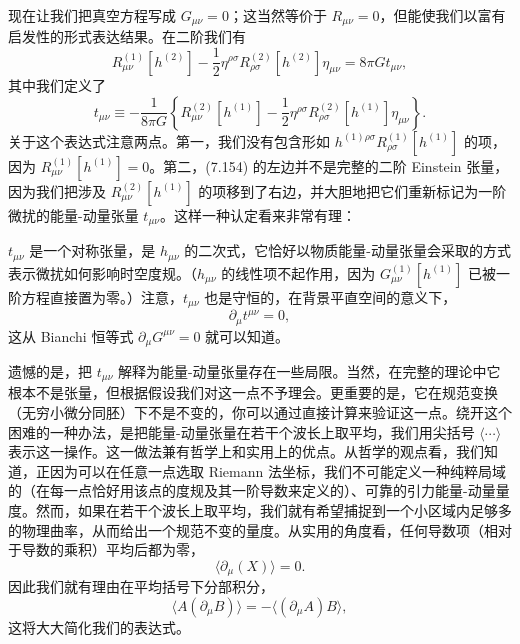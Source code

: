 现在让我们把真空方程写成 $G_{\mu\nu} = 0$；这当然等价于 $R_{\mu\nu} = 0$，但能使我们以富有启发性的形式表达结果。在二阶我们有
\begin{equation*}
R^{(1)}_{\mu\nu}[h^{(2)}] - \frac{1}{2}\eta^{\rho\sigma}R^{(2)}_{\rho\sigma}[h^{(2)}]\eta_{\mu\nu} = 8\pi G t_{\mu\nu},
\tag{7.154}
\end{equation*}
其中我们定义了
\begin{equation*}
t_{\mu\nu} \equiv -\frac{1}{8\pi G}\left\{R^{(2)}_{\mu\nu}[h^{(1)}] - \frac{1}{2}\eta^{\rho\sigma}R^{(2)}_{\rho\sigma}[h^{(1)}]\eta_{\mu\nu}\right\}.
\tag{7.155}
\end{equation*}
关于这个表达式注意两点。第一，我们没有包含形如 $h^{(1)\rho\sigma}R^{(1)}_{\rho\sigma}[h^{(1)}]$ 的项，因为 $R^{(1)}_{\mu\nu}[h^{(1)}] = 0$。第二，(7.154) 的左边并不是完整的二阶 Einstein 张量，因为我们把涉及 $R^{(2)}_{\mu\nu}[h^{(1)}]$ 的项移到了右边，并大胆地把它们重新标记为一阶微扰的能量-动量张量 $t_{\mu\nu}$。这样一种认定看来非常有理：


$t_{\mu\nu}$ 是一个对称张量，是 $h_{\mu\nu}$ 的二次式，它恰好以物质能量-动量张量会采取的方式表示微扰如何影响时空度规。（$h_{\mu\nu}$ 的线性项不起作用，因为 $G^{(1)}_{\mu\nu}[h^{(1)}]$ 已被一阶方程直接置为零。）注意，$t_{\mu\nu}$ 也是守恒的，在背景平直空间的意义下，
\begin{equation*}
\partial_\mu t^{\mu\nu} = 0,
\tag{7.156}
\end{equation*}
这从 Bianchi 恒等式 $\partial_\mu G^{\mu\nu} = 0$ 就可以知道。

遗憾的是，把 $t_{\mu\nu}$ 解释为能量-动量张量存在一些局限。当然，在完整的理论中它根本不是张量，但根据假设我们对这一点不予理会。更重要的是，它在规范变换（无穷小微分同胚）下不是不变的，你可以通过直接计算来验证这一点。绕开这个困难的一种办法，是把能量-动量张量在若干个波长上取平均，我们用尖括号 $\langle\cdots\rangle$ 表示这一操作。这一做法兼有哲学上和实用上的优点。从哲学的观点看，我们知道，正因为可以在任意一点选取 Riemann 法坐标，我们不可能定义一种纯粹局域的（在每一点恰好用该点的度规及其一阶导数来定义的）、可靠的引力能量-动量量度。然而，如果在若干个波长上取平均，我们就有希望捕捉到一个小区域内足够多的物理曲率，从而给出一个规范不变的量度。从实用的角度看，任何导数项（相对于导数的乘积）平均后都为零，
\begin{equation*}
\langle\partial_\mu(X)\rangle = 0.
\tag{7.157}
\end{equation*}
因此我们就有理由在平均括号下分部积分，
\begin{equation*}
\langle A(\partial_\mu B)\rangle = -\langle(\partial_\mu A)B\rangle,
\tag{7.158}
\end{equation*}
这将大大简化我们的表达式。

